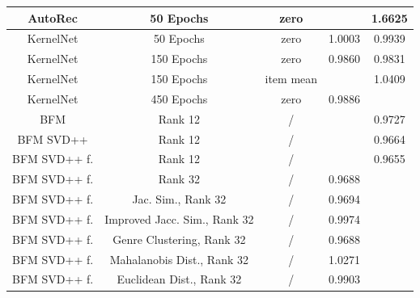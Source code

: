 \documentclass[10pt,conference,compsocconf]{IEEEtran}
\begin{document}
\begin{table}[h]
\begin{tabular}{|| c | c | c | c | c ||}
            AutoRec              & 50 Epochs                             & zero                    &                        & 1.6625                  \\
            \hline
            KernelNet            & 50 Epochs                             & zero                    & 1.0003                 & 0.9939                  \\
            KernelNet            & 150 Epochs                            & zero                    & 0.9860                 & 0.9831                  \\
            KernelNet            & 150 Epochs                            & item mean               &                        & 1.0409                  \\
            KernelNet            & 450 Epochs                            & zero                    & 0.9886                 &                         \\
            \hline
            BFM                  & Rank 12                               & /                       &                        & 0.9727                  \\
            BFM SVD++            & Rank 12                               & /                       &                        & 0.9664                  \\
            BFM SVD++ f.         & Rank 12                               & /                       &                        & 0.9655                  \\
            BFM SVD++ f.         & Rank 32                               & /                       & 0.9688                 &                         \\
            BFM SVD++ f.         & Jac. Sim., Rank 32                    & /                       & 0.9694                 &                         \\
            BFM SVD++ f.         & Improved Jacc. Sim., Rank 32          & /                       & 0.9974                 &                         \\
            BFM SVD++ f.         & Genre Clustering, Rank 32             & /                       & 0.9688                 &                         \\
            BFM SVD++ f.         & Mahalanobis Dist., Rank 32            & /                       & 1.0271                 &                         \\
            BFM SVD++ f.         & Euclidean Dist., Rank 32              & /                       & 0.9903                 &                         \\

\end{tabular}
\end{table}
\end{document}
